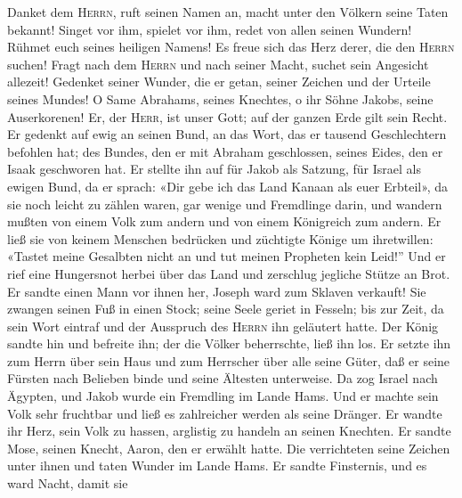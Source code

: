  Danket dem \textsc{Herrn}, ruft seinen Namen an, macht
unter den Völkern seine Taten bekannt!  Singet vor ihm,
spielet vor ihm, redet von allen seinen Wundern!  Rühmet
euch seines heiligen Namens! Es freue sich das Herz derer, die den
\textsc{Herrn} suchen!  Fragt nach dem \textsc{Herrn} und
nach seiner Macht, suchet sein Angesicht allezeit! 
Gedenket seiner Wunder, die er getan, seiner Zeichen und der Urteile
seines Mundes!  O Same Abrahams, seines Knechtes, o ihr
Söhne Jakobs, seine Auserkorenen!  Er, der \textsc{Herr},
ist unser Gott; auf der ganzen Erde gilt sein Recht.  Er
gedenkt auf ewig an seinen Bund, an das Wort, das er tausend
Geschlechtern befohlen hat;  des Bundes, den er mit
Abraham geschlossen, seines Eides, den er Isaak geschworen hat.
 Er stellte ihn auf für Jakob als Satzung, für Israel als
ewigen Bund,  da er sprach: «Dir gebe ich das Land Kanaan
als euer Erbteil»,  da sie noch leicht zu zählen waren,
gar wenige und Fremdlinge darin,  und wandern mußten von
einem Volk zum andern und von einem Königreich zum andern.
 Er ließ sie von keinem Menschen bedrücken und züchtigte
Könige um ihretwillen:  «Tastet meine Gesalbten nicht an
und tut meinen Propheten kein Leid!''  Und er rief eine
Hungersnot herbei über das Land und zerschlug jegliche Stütze an Brot.
 Er sandte einen Mann vor ihnen her, Joseph ward zum
Sklaven verkauft!  Sie zwangen seinen Fuß in einen Stock;
seine Seele geriet in Fesseln;  bis zur Zeit, da sein
Wort eintraf und der Ausspruch des \textsc{Herrn} ihn geläutert hatte.
 Der König sandte hin und befreite ihn; der die Völker
beherrschte, ließ ihn los.  Er setzte ihn zum Herrn über
sein Haus und zum Herrscher über alle seine Güter,  daß
er seine Fürsten nach Belieben binde und seine Ältesten unterweise.
 Da zog Israel nach Ägypten, und Jakob wurde ein
Fremdling im Lande Hams.  Und er machte sein Volk sehr
fruchtbar und ließ es zahlreicher werden als seine Dränger.
 Er wandte ihr Herz, sein Volk zu hassen, arglistig zu
handeln an seinen Knechten.  Er sandte Mose, seinen
Knecht, Aaron, den er erwählt hatte.  Die verrichteten
seine Zeichen unter ihnen und taten Wunder im Lande Hams.
 Er sandte Finsternis, und es ward Nacht, damit sie
